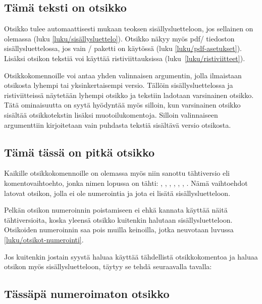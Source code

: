 \begin{koodilohkosis}
\section{Tämä teksti on otsikko}
\end{koodilohkosis}

Otsikko tulee automaattisesti mukaan teoksen sisällysluetteloon, jos
sellainen on olemassa (luku \ref{luku/sisällysluettelo}). Otsikko näkyy
myös pdf\-/ tiedoston sisällysluettelossa, jos vain
\-/ paketti on käytössä (luku
\ref{luku/pdf-asetukset}). Lisäksi otsikon tekstiä voi käyttää
ristiviittauksissa (luku~\ref{luku/ristiviitteet}).

Otsikkokomennoille voi antaa yhden valinnaisen argumentin, jolla
ilmaistaan otsikosta lyhempi tai yksinkertaisempi versio. Tällöin
sisällysluettelossa ja ristiviitteissä näytetään lyhempi otsikko ja
tekstiin ladotaan varsinainen otsikko. Tätä ominaisuutta on syytä
hyödyntää myös silloin, kun varsinainen otsikko sisältää otsikkotekstin
lisäksi muotoilukomentoja. Silloin valinnaiseen argumenttiin
kirjoitetaan vain puhdasta tekstiä sisältävä versio otsikosta.

\begin{koodilohkosis}
\section[Lyhyt otsikko]{Tämä tässä on pitkä otsikko}
\end{koodilohkosis}

Kaikille otsikkokomennoille on olemassa myös niin sanottu tähtiversio
eli komentovaihtoehto, jonka nimen lopussa on tähti: ,
, , ,
, , .
Nämä vaihtoehdot latovat otsikon, jolla ei ole numerointia ja jota ei
lisätä sisällysluetteloon.

Pelkän otsikon numeroinnin poistamiseen ei ehkä kannata käyttää näitä
tähtiversioita, koska yleensä otsikko kuitenkin halutaan
sisällysluetteloon. Otsikoiden numeroinnin saa pois muilla keinoilla,
jotka neuvotaan luvussa \ref{luku/otsikot-numerointi}.

Jos kuitenkin jostain syystä haluaa käyttää tähdellistä otsikkokomentoa
ja haluaa otsikon myös sisällysluetteloon, täytyy se tehdä seuraavalla
tavalla:

\begin{koodilohkosis}
\section*{Tässäpä numeroimaton otsikko}
{}
\end{koodilohkosis}

